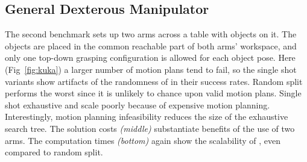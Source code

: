 
\subsection{General Dexterous Manipulator} The second benchmark sets up two \kuka arms across a table with objects on it. The objects are placed in the common reachable part of both arms' workspace, and only one top-down grasping configuration is allowed for each object pose. Here (Fig~\ref{fig:kuka}) a larger number of motion plans tend to fail, so the single shot variants show artifacts of the randomness of \drrtstar in their success rates. 
Random split performs the worst since it is unlikely to chance upon valid motion plans. Single shot exhaustive and \milp scale poorly because of expensive motion planning.
Interestingly, motion planning infeasibility reduces the size of the exhaustive search tree.
The solution costs \textit{(middle)} substantiate benefits of the use of two arms. The computation times \textit{(bottom)} again show the scalability of \algo, even compared to random split.



